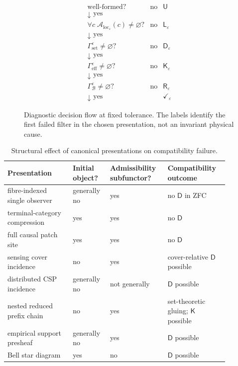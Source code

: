 \documentclass[11pt]{article}
\theoremstyle{plain}
\theoremstyle{definition}
\theoremstyle{remark}
\newcommand{\LocalAdm}{\mathcal{A}_{\mathrm{loc}}}
\newcommand{\eps}{\varepsilon}
\begin{document}
\begin{figure}[htbp]
\centering
\[
\begin{array}{ccl}
\text{well-formed?} & \text{no} & \mathsf U\\
\downarrow\text{ yes} &&\\[-1mm]
\forall c\;\LocalAdm_\eps(c)\ne\varnothing? & \text{no} & \mathsf L_\eps\\
\downarrow\text{ yes} &&\\[-1mm]
\Gamma_{\mathrm{set}}^\eps\ne\varnothing? & \text{no} & \mathsf D_\eps\\
\downarrow\text{ yes} &&\\[-1mm]
\Gamma_{\mathrm{eff}}^\eps\ne\varnothing? & \text{no} & \mathsf K_\eps\\
\downarrow\text{ yes} &&\\[-1mm]
\Gamma_{\mathcal B}^\eps\ne\varnothing? & \text{no} & \mathsf R_\eps\\
\downarrow\text{ yes} && \checkmark_\eps
\end{array}
\]
\caption{Diagnostic decision flow at fixed tolerance. The labels identify the
first failed filter in the chosen presentation, not an invariant physical cause.}
\label{fig:diagnostic-flow}
\end{figure}

\begin{table}[htbp]
\centering
\caption{Structural effect of canonical presentations on compatibility failure.}
\label{tab:presentations}
\begin{tabular}{@{}p{0.27\linewidth}p{0.14\linewidth}p{0.22\linewidth}p{0.25\linewidth}@{}}
\toprule
Presentation & Initial object? & Admissibility subfunctor? & Compatibility outcome\\
\midrule
fibre-indexed single observer & generally no & yes & no $\mathsf D$ in ZFC\\
terminal-category compression & yes & yes & no $\mathsf D$\\
full causal patch site & yes & yes & no $\mathsf D$\\
sensing cover incidence & no & yes & cover-relative $\mathsf D$ possible\\
distributed CSP incidence & generally no & not generally & $\mathsf D$ possible\\
nested reduced prefix chain & no & yes & set-theoretic gluing; $\mathsf K$ possible\\
empirical support presheaf & generally no & yes & $\mathsf D$ possible\\
Bell star diagram & yes & no & $\mathsf D$ possible\\
\bottomrule
\end{tabular}
\end{table}
\end{document}
